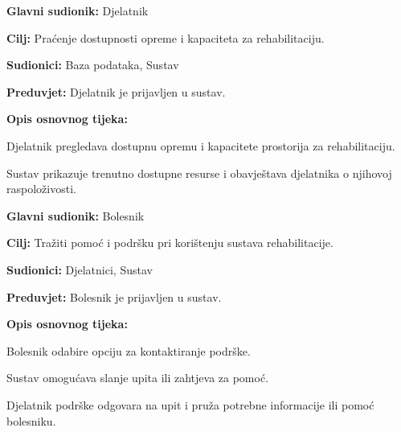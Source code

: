 \documentclass{article}
\begin{document}
\vspace{1em} %
\begin{packed_item}
\item \textbf{Glavni sudionik:} Djelatnik
\item \textbf{Cilj:} Praćenje dostupnosti opreme i kapaciteta za rehabilitaciju.
\item \textbf{Sudionici:} Baza podataka, Sustav
\item \textbf{Preduvjet:} Djelatnik je prijavljen u sustav.
\item \textbf{Opis osnovnog tijeka:}
\begin{packed_enum}
\item Djelatnik pregledava dostupnu opremu i kapacitete prostorija za rehabilitaciju.
\item Sustav prikazuje trenutno dostupne resurse i obavještava djelatnika o njihovoj raspoloživosti.
\end{packed_enum}
\end{packed_item}

\vspace{1em} %
\begin{packed_item}
\item \textbf{Glavni sudionik:} Bolesnik
\item \textbf{Cilj:} Tražiti pomoć i podršku pri korištenju sustava rehabilitacije.
\item \textbf{Sudionici:} Djelatnici, Sustav
\item \textbf{Preduvjet:} Bolesnik je prijavljen u sustav.
\item \textbf{Opis osnovnog tijeka:}
\begin{packed_enum}
\item Bolesnik odabire opciju za kontaktiranje podrške.
\item Sustav omogućava slanje upita ili zahtjeva za pomoć.
\item Djelatnik podrške odgovara na upit i pruža potrebne informacije ili pomoć bolesniku.
\end{packed_enum}
\end{packed_item}
\end{document}
